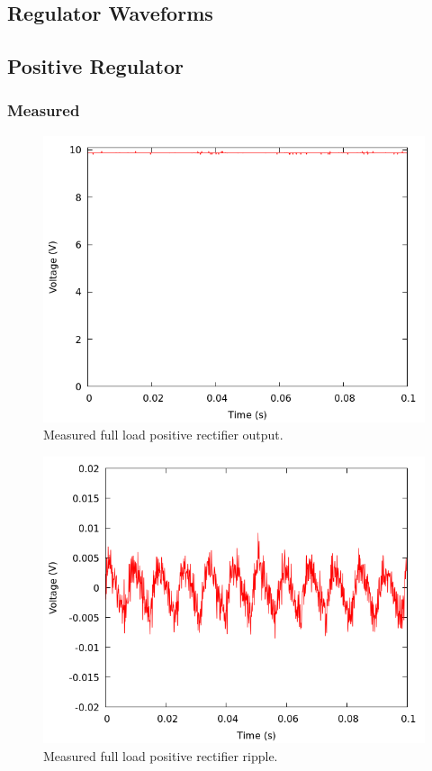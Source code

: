 \documentclass[12pt]{article}
\newcommand{\graphwidth}{0.5\linewidth}
\begin{document}
\begin{appendix}
\section{Regulator Waveforms}

\subsection{Positive Regulator}

\subsubsection{Measured}

\begin{figure}[H]
    \centering
    \includegraphics[width=\graphwidth]{./res/image/pos-fullload.png}
    \caption{Measured full load positive rectifier output.}
    \label{fig:pos_fullload}
\end{figure}

\begin{figure}[H]
    \centering
    \includegraphics[width=\graphwidth]{./res/image/pos-fullload-ripple.png}
    \caption{Measured full load positive rectifier ripple.}
    \label{fig:pos_fullload_ripple}
\end{figure}


\end{appendix}
\end{document}

